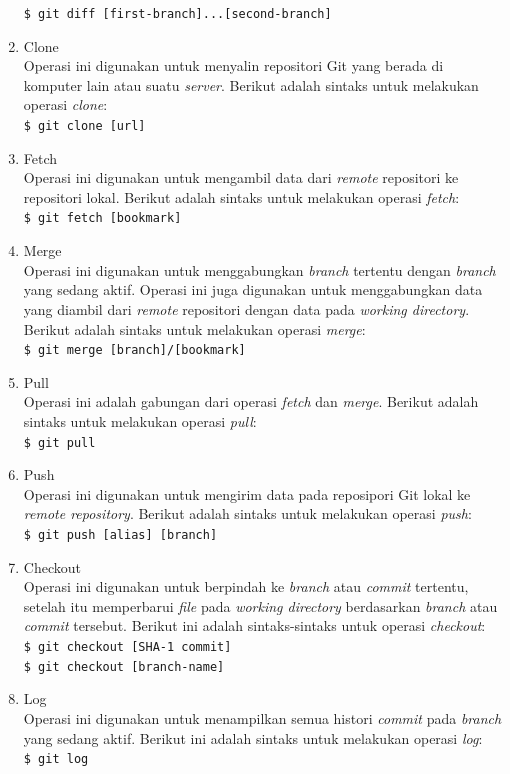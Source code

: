 \begin{enumerate}
\texttt{\$ git diff [first-branch]...[second-branch]}
\item Clone\\
Operasi ini digunakan untuk menyalin repositori Git yang berada di komputer lain atau suatu \textit{server}. Berikut adalah sintaks untuk melakukan operasi \textit{clone}:\\
\texttt{\$ git clone [url]}
\item Fetch\\
Operasi ini digunakan untuk mengambil data dari \textit{remote} repositori ke repositori lokal. Berikut adalah sintaks untuk melakukan operasi \textit{fetch}:\\
\texttt{\$ git fetch [bookmark]}
\item Merge\\
Operasi ini digunakan untuk menggabungkan \textit{branch} tertentu dengan \textit{branch} yang sedang aktif. Operasi ini juga digunakan untuk menggabungkan data yang diambil dari \textit{remote} repositori dengan data pada \textit{working directory}. Berikut adalah sintaks untuk melakukan operasi \textit{merge}:\\
\texttt{\$ git merge [branch]/[bookmark]}
\item Pull\\
Operasi ini adalah gabungan dari operasi \textit{fetch} dan \textit{merge}. Berikut adalah sintaks untuk melakukan operasi \textit{pull}:\\
\texttt{\$ git pull}
\item Push\\
Operasi ini digunakan untuk mengirim data pada reposipori Git lokal ke \textit{remote repository}.
Berikut adalah sintaks untuk melakukan operasi \textit{push}:\\
\texttt{\$ git push [alias] [branch]}
\item Checkout\\
Operasi ini digunakan untuk berpindah ke \textit{branch} atau \textit{commit} tertentu, setelah itu memperbarui \textit{file} pada \textit{working directory} berdasarkan \textit{branch} atau \textit{commit} tersebut. Berikut ini adalah sintaks-sintaks untuk operasi \textit{checkout}:\\
\texttt{\$ git checkout [SHA-1 commit]}\\
\texttt{\$ git checkout [branch-name]}
\item Log\\
Operasi ini digunakan untuk menampilkan semua histori \textit{commit} pada \textit{branch} yang sedang aktif. Berikut ini adalah sintaks untuk melakukan operasi \textit{log}:\\
\texttt{\$ git log}
\end{enumerate}
